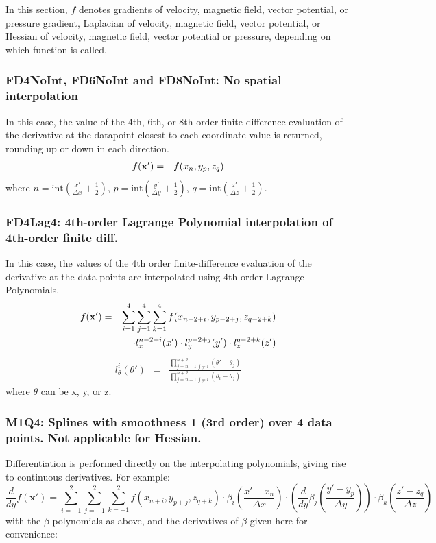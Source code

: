 \documentclass[11pt]{article}
\def\bea{\begin{eqnarray}}
\def\eea{\end{eqnarray}}
\begin{document}
In this section, $f$ denotes gradients of velocity, magnetic field, vector potential, or pressure gradient,
Laplacian of velocity, magnetic field, vector potential, or Hessian of velocity, magnetic field, vector potential or pressure, depending on
which function is called.
\subsubsection*{FD4NoInt, FD6NoInt and FD8NoInt: No spatial  interpolation}

In this case, the value of the 4th, 6th, or 8th order finite-difference
evaluation of the derivative at the datapoint closest to each coordinate value is
returned, rounding up or down in each direction.
\bea f({\bf x'}) &=& f(x_n,y_p,z_q)\eea where
$n=\textrm{int}(\frac{x'}{\Delta x}+\frac{1}{2})$,
$p=\textrm{int}(\frac{y'}{\Delta y}+\frac{1}{2})$,
$q=\textrm{int}(\frac{z'}{\Delta z}+\frac{1}{2})$.

\subsubsection*{FD4Lag4: 4th-order Lagrange Polynomial interpolation of 4th-order finite diff.}

In this case, the values of the 4th order finite-difference
evaluation of the derivative at the data points are interpolated using 4th-order Lagrange Polynomials.
\bea f({\bf x'}) &=&
\sum_{i=1}^4\sum_{j=1}^4\sum_{k=1}^4f(x_{n-2+i},y_{p-2+j},z_{q-2+k})\nonumber\\
&&\cdot l_x^{n-2+i}(x')\cdot l_y^{p-2+j}(y')\cdot
l_z^{q-2+k}(z')\eea \bea l_\theta^i(\theta') &=&
\frac{\prod\limits_{j=n-1,j\neq
i}^{n+2}(\theta'-\theta_j)}{\prod\limits_{j=n-1,j\neq
i}^{n+2}(\theta_i-\theta_j)}\eea where $\theta$ can be x, y, or z.

\subsubsection*{M1Q4: Splines with smoothness 1 (3rd order) over 4 data points. Not applicable for Hessian.}
Differentiation is performed directly on the interpolating polynomials, giving rise to continuous derivatives.
For example:
\begin{equation}
    \frac{d}{dy} f(\mathbf{x}') =
    \sum_{i=-1}^2 \sum_{j=-1}^2 \sum_{k=-1}^2
    f(x_{n+i}, y_{p+j}, z_{q+k})
    \cdot \beta_i\left(\frac{x' - x_n}{\Delta x}\right)
    \cdot \left(\frac{d}{dy} \beta_j\left(\frac{y' - y_p}{\Delta y}\right)\right)
    \cdot \beta_k\left(\frac{z' - z_q}{\Delta z}\right)
\end{equation}
with the $\beta$ polynomials as above, and the derivatives of $\beta$ given here for convenience:

\end{document}
